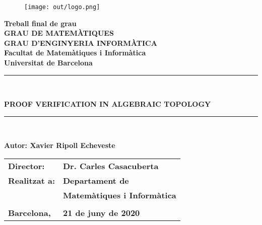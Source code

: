 \begin{titlepage}
\pagestyle{empty}
\begin{center}
\begin{figure}[htb]
\begin{center}
\texttt{[image: out/logo.png]}
\end{center}
\end{figure}

\textbf{\LARGE Treball final de grau} \\
\vspace*{.5cm}
\textbf{\LARGE GRAU DE MATEM\`{A}TIQUES } \\
\textbf{\LARGE GRAU D'ENGINYERIA INFORMÀTICA } \\
\vspace*{.5cm}
\textbf{\LARGE Facultat de Matem\`atiques i Inform\`atica\\ Universitat de Barcelona} \\
\vspace*{1.5cm}
\rule{16cm}{0.1mm}\\
\begin{Huge}
\textbf{PROOF VERIFICATION IN ALGEBRAIC TOPOLOGY} \\
\end{Huge}
\rule{16cm}{0.1mm}\\

\vspace{1cm}

\begin{flushright}
\textbf{\LARGE Autor: Xavier Ripoll Echeveste}

\vspace*{2cm}

\renewcommand{\arraystretch}{1.5}
\begin{tabular}{ll}
\textbf{\Large Director:} & \textbf{\Large Dr. Carles Casacuberta } \\
\textbf{\Large Realitzat a:} & \textbf{\Large  Departament de   } \\
 & \textbf{\Large Matemàtiques i Informàtica} \\
\\
\textbf{\Large Barcelona,} & \textbf{\Large 21 de juny de 2020 }
\end{tabular}

\end{flushright}

\end{center}

\end{titlepage}
